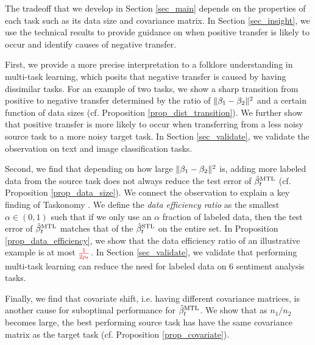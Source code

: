 The tradeoff that we develop in Section \ref{sec_main} depends on the properties of each task such as its data size and covariance matrix.
In Section \ref{sec_insight}, we use the technical results to provide guidance on when positive transfer is likely to occur and identify causes of negative transfer.
\squishlist
		\item First, we provide a more precise interpretation to a folklore understanding in multi-task learning, which posits that negative transfer is caused by having dissimilar tasks.
		For an example of two tasks, we show a sharp transition from positive to negative transfer determined by the ratio of $\|\beta_1 - \beta_2\|^2$ and a certain function of data sizes (cf. Proposition \ref{prop_dist_transition}).
		We further show that positive transfer is more likely to occur when transferring from a less noisy source task to a more noisy target task.
		In Section \ref{sec_validate}, we validate the observation on text and image classification tasks.
		\item Second, we find that depending on how large $\|\beta_1 - \beta_2\|^2$ is, adding more labeled data from the source task does not always reduce the test error of $\hat{\beta}_t^{\text{MTL}}$ (cf. Proposition \ref{prop_data_size}).
	We connect the observation to explain a key finding of Taskonomy \cite{ZSSGM18}.
	We define the \textit{data efficiency ratio} as the smallest $\alpha\in(0, 1)$ such that if we only use an $\alpha$ fraction of labeled data, then the test error of $\hat{\beta}_t^{\text{MTL}}$ matches that of the $\hat{\beta}_t^{\text{STL}}$ on the entire set.
	In Proposition \ref{prop_data_efficiency}, we show that the data efficiency ratio of an illustrative example is at most $\textcolor{red}{\frac {1}{2\rho_t}}$.
	In Section \ref{sec_validate}, we validate that performing multi-task learning can reduce the need for labeled data on 6 sentiment analysis tasks. %
		\item Finally, we find that covariate shift, i.e. having different covariance matrices, is another cause for suboptimal performance for $\hat{\beta}_t^{\text{MTL}}$.
		We show that as $n_1 / n_2$ becomes large, the best performing source task has have the same covariance matrix as the target task (cf. Proposition \ref{prop_covariate}).
\squishend

